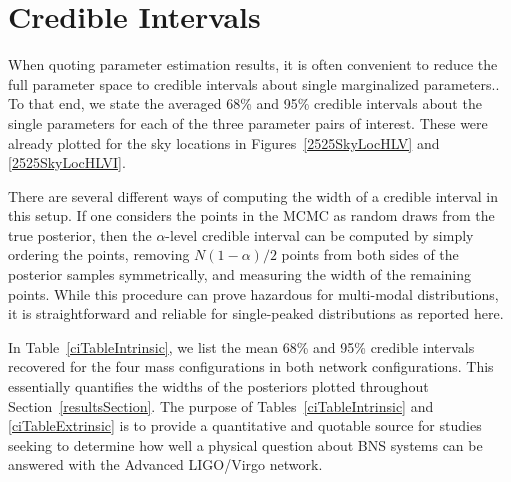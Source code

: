 \documentclass[11pt,a4paper]{emulateapj} 
\newcommand{\carl}[1]{{\color{red} #1}}
\begin{document}

\section{Credible Intervals}
\label{ciSection}

When quoting parameter estimation results, it is often convenient to
reduce the full parameter space to credible intervals about single
marginalized parameters..  To that end, we state the averaged 68\% and 95\% credible
intervals about the single parameters for each of the three
parameter pairs of interest.  These were already plotted for the sky
locations in Figures~\ref{2525SkyLocHLV} and \ref{2525SkyLocHLVI}.

There are several different ways of computing the width of a credible
interval in this setup.  If one considers the points in the MCMC as
random draws from the true posterior, then the $\alpha$-level credible
interval can be computed by simply ordering the points, removing
$N(1-\alpha )/2$ points from both sides of the posterior samples
symmetrically, and measuring the width of the remaining points.  While
this procedure can prove hazardous for multi-modal distributions, it
is straightforward and reliable for single-peaked distributions as
reported here.

In Table~\ref{ciTableIntrinsic}, we list the mean 68\% and 95\% credible
intervals recovered for the four mass configurations in both network
configurations. This essentially quantifies the widths of the
posteriors plotted throughout Section~\ref{resultsSection}.  The
purpose of Tables~\ref{ciTableIntrinsic} and \ref{ciTableExtrinsic} is
to provide a quantitative and quotable source for studies seeking to
determine how well a physical question about BNS systems can be
answered with the Advanced LIGO/Virgo network.
\end{document}
